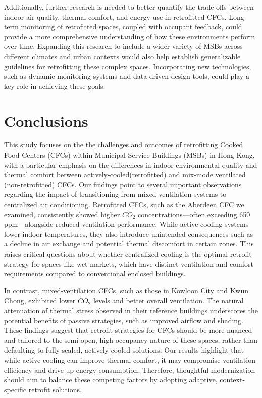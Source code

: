 \documentclass[preprint,12pt]{elsarticle}
\begin{document}
Additionally, further research is needed to better quantify the trade-offs between indoor air quality, thermal comfort, and energy use in retrofitted CFCs\cite{40,41}. Long-term monitoring of retrofitted spaces, coupled with occupant feedback, could provide a more comprehensive understanding of how these environments perform over time. Expanding this research to include a wider variety of MSBs across different climates and urban contexts would also help establish generalizable guidelines for retrofitting these complex spaces. Incorporating new technologies, such as dynamic monitoring systems\cite{42} and data-driven design tools, could play a key role in achieving these goals. 


\section{Conclusions}

This study focuses on the the challenges and outcomes of retrofitting Cooked Food Centers (CFCs) within Municipal Service Buildings (MSBs) in Hong Kong, with a particular emphasis on the differences in indoor environmental quality and thermal comfort between actively-cooled(retrofitted) and mix-mode ventilated (non-retrofitted) CFCs. Our findings point to several important observations regarding the impact of transitioning from mixed ventilation systems to centralized air conditioning. Retrofitted CFCs, such as the Aberdeen CFC we examined, consistently showed higher $CO_2$ concentrations—often exceeding 650 ppm—alongside reduced ventilation performance. While active cooling systems lower indoor temperatures, they also introduce unintended consequences such as a decline in air exchange and potential thermal discomfort in certain zones. This raises critical questions about whether centralized cooling is the optimal retrofit strategy for spaces like wet markets, which have distinct ventilation and comfort requirements compared to conventional enclosed buildings.

In contrast, mixed-ventilation CFCs, such as those in Kowloon City and Kwun Chong, exhibited lower $CO_2$ levels and better overall ventilation. The natural attenuation of thermal stress observed in their reference buildings underscores the potential benefits of passive strategies, such as improved airflow and shading. These findings suggest that retrofit strategies for CFCs should be more nuanced and tailored to the semi-open, high-occupancy nature of these spaces, rather than defaulting to fully sealed, actively cooled solutions. Our results highlight that while active cooling can improve thermal comfort, it may compromise ventilation efficiency and drive up energy consumption. Therefore, thoughtful modernization should aim to balance these competing factors by adopting adaptive, context-specific retrofit solutions.
\end{document}
